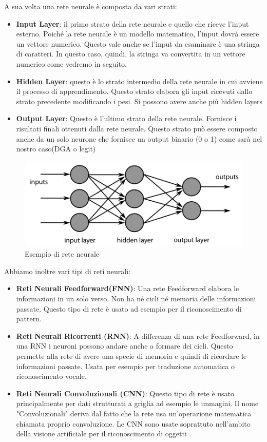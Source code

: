 \documentclass[12pt,a4paper,openright,twoside]{book}
\begin{document}
A sua volta una rete neurale è composta da vari strati:
\begin{itemize}
    \item \textbf{Input Layer}: il primo strato della rete neurale
    e quello che riceve l'input esterno. Poiché la rete neurale
    è un modello matematico, l'input dovrà essere
    un vettore numerico. Questo vale anche se l'input da esaminare
    è una stringa di caratteri. In questo caso, quindi, la stringa va convertita in un vettore numerico
    come vedremo in seguito.
    \item \textbf{Hidden Layer}: questo è lo strato intermedio della rete neurale in cui avviene
    il processo di apprendimento.
    Questo strato elabora gli input ricevuti dallo strato precedente
    modificando i pesi. Si possono avere anche più hidden layers
    \item \textbf{Output Layer}: Questo è l'ultimo strato della rete neurale.
    Fornisce i risultati finali ottenuti dalla rete neurale. Questo strato
    può essere composto anche da un solo neurone che fornisce
    un output binario (0 o 1) come sarà nel nostro caso(DGA o legit)
\end{itemize}

\begin{figure}[H]
    \centering
    \includegraphics[width=.8\linewidth]{figures/MultiLayerNeuralNetwork.png}
    \caption{Esempio di rete neurale \cite{wiki:001}}
    \label{fig:ANN}
\end{figure}

Abbiamo inoltre vari tipi di reti neurali:
\begin{itemize}
    \item \textbf{Reti Neurali Feedforward(FNN)}: Una rete Feedforward
    elabora le informazioni in un solo verso. Non ha né cicli
    né memoria delle informazioni passate. Questo tipo di rete
    è usato ad esempio per il riconoscimento di pattern.
    \item \textbf{Reti Neurali Ricorrenti (RNN)}:
    A differenza di una rete Feedforward, in una RNN 
    i neuroni possono andare anche a formare dei cicli. 
    Questo permette alla rete di avere una specie di memoria
    e quindi di ricordare le informazioni passate. Usata
    per esempio per traduzione automatica o riconoscimento vocale.
    \item \textbf{Reti Neurali Convoluzionali (CNN)}: Questo tipo di rete
    è usato principalmente per dati strutturati a griglia ad esempio le immagini.
    Il nome "Convoluzionali" deriva dal fatto che la
    rete usa un'operazione matematica chiamata proprio
    convoluzione. Le CNN sono usate soprattuto nell'ambito della
    visione artificiale per il riconoscimento di oggetti
    \cite{Goodfellow-et-al-2016}.
\end{itemize}
\end{document}
